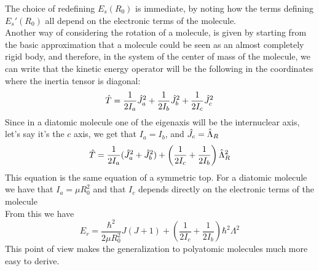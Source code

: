 \documentclass[../qm.tex]{subfiles}
\begin{document}
	The choice of redefining $E_s(R_0)$ is immediate, by noting how the terms defining $E_s'(R_0)$ all depend on the electronic terms of the molecule.\\
	Another way of considering the rotation of a molecule, is given by starting from the basic approximation that a molecule could be seen as an almost completely rigid body, and therefore, in the system of the center of mass of the molecule, we can write that the kinetic energy operator will be the following in the coordinates where the inertia tensor is diagonal:
	\begin{equation}
		\hat{T}=\frac{1}{2I_a}\hat{J}_a^2+\frac{1}{2I_b}\hat{J}_b^2+\frac{1}{2I_c}\hat{J}_c^2
		\label{eq:kineticoperatorquantumtop}
	\end{equation}
	Since in a diatomic molecule one of the eigenaxis will be the internuclear axis, let's say it's the $c$ axis, we get that $I_a=I_b$, and $\hat{J}_c=\hat{\Lambda}_R$
	\begin{equation*}
		\hat{T}=\frac{1}{2I_a}(\hat{J}_a^2+\hat{J}_b^2)+\left( \frac{1}{2I_c}+\frac{1}{2I_b} \right)\hat{\Lambda}_R^2
	\end{equation*}
	This equation is the same equation of a symmetric top. For a diatomic molecule we have that $I_a=\mu R_0^2$ and that $I_c$ depends directly on the electronic terms of the molecule\\
	From this we have
	\begin{equation}
		E_{r}=\frac{\hbar^2}{2\mu R_0^2}J(J+1)+\left( \frac{1}{2I_c}+\frac{1}{2I_b} \right)\hbar^2\Lambda^2
		\label{eq:rotationalenergyII}
	\end{equation}
	This point of view makes the generalization to polyatomic molecules much more easy to derive.\\
\end{document}
